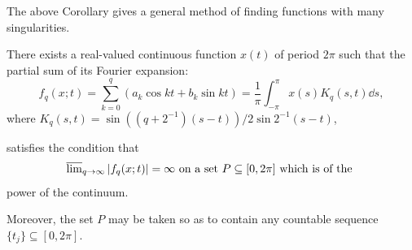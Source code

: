 The above Corollary gives a general method of finding functions with many singularities. 

\begin{examplen} There exists a real-valued continuous function $x(t)$ of period $2\pi$ such that the partial sum of its Fourier expansion:
\begin{equation}\label{eq:II.4.1}
f _{q} (x; t) = \sum\limits_{k=0} ^{q} \left(a _{k} \cos k t + b _{k} \sin k t\right) = \frac {1}{\pi} \int_{- \pi} ^{\pi} x (s) K _{q} (s, t) \dd s,
\end{equation}
where $K_{q}(s,t) = \sin ((q + 2^{-1})(s - t)) / 2\sin 2^{-1}(s - t)$, 


satisfies the condition that 
\begin{equation}\label{eq:II.4.2}
\varlimsup\limits_{q \to \infty} | f _{q} (x; t) | = \infty \text{ on a set } P \subseteq [ 0, 2 \pi ] \text{ which is of the }
\end{equation}
power of the continuum. 

Moreover, the set $P$ may be taken so as to contain any countable sequence $\{t_j\} \subseteq [0, 2\pi]$. 

\end{examplen}
